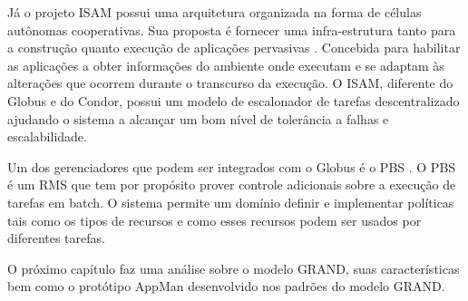 Já o projeto ISAM \cite{isam} possui uma arquitetura organizada na forma de células autônomas cooperativas. Sua proposta é fornecer uma infra-estrutura tanto para a construção quanto execução de aplicações pervasivas \cite {isam}. Concebida para habilitar as aplicações a obter informações do ambiente onde executam e se adaptam às alterações que ocorrem durante o transcurso da execução. O ISAM, diferente do Globus e do Condor, possui um modelo de escalonador de tarefas descentralizado ajudando o sistema a alcançar um bom nível de tolerância a falhas e escalabilidade.

Um dos gerenciadores que podem ser integrados com o Globus é o PBS \cite{Bayucan1998}. O PBS é um RMS que tem por propósito prover controle adicionais sobre a execução de tarefas em batch. O sistema permite um domínio definir e implementar políticas tais como os tipos de recursos e como esses recursos podem ser usados por diferentes tarefas.



O próximo capítulo faz uma análise sobre o modelo GRAND, suas características bem como o protótipo AppMan desenvolvido nos padrões do modelo GRAND.
